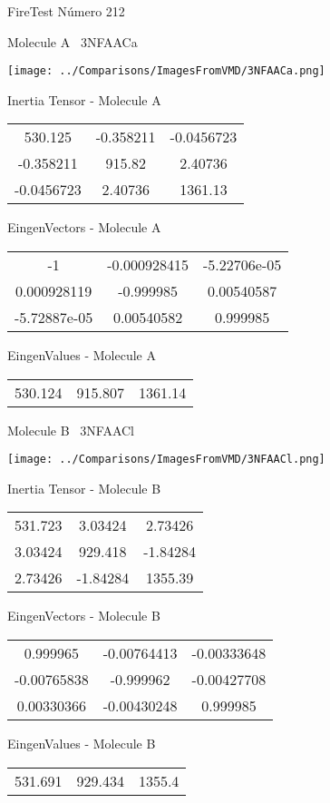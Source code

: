 \vtab[-3cm]
\begin{center}
{\large FireTest \tab Número 212}
\end{center}
\begin{multicols}{2}
\begin{center}

Molecule A \
3NFAACa

\texttt{[image: ../Comparisons/ImagesFromVMD/3NFAACa.png]}

Inertia Tensor - Molecule A \\
\begin{tabular}{|c c c|}
530.125	 & 	-0.358211	 & 	-0.0456723	 \\
-0.358211	 & 	915.82	 & 	2.40736	 \\
-0.0456723	 & 	2.40736	 & 	1361.13
\end{tabular}

\vtab
 EingenVectors - Molecule A     \\
\begin{tabular}{|c c c|}
-1	 & 	-0.000928415	 & 	-5.22706e-05	 \\
0.000928119	 & 	-0.999985	 & 	0.00540587	 \\
-5.72887e-05	 & 	0.00540582	 & 	0.999985
\end{tabular}

\vtab
 EingenValues - Molecule A     \\
\begin{tabular}{|c c c|}
530.124	 & 	915.807	 & 	1361.14	 \\
\end{tabular}
\columnbreak

Molecule B \
3NFAACl

\texttt{[image: ../Comparisons/ImagesFromVMD/3NFAACl.png]}

Inertia Tensor - Molecule B \\
\begin{tabular}{|c c c|}
531.723	 & 	3.03424	 & 	2.73426	 \\
3.03424	 & 	929.418	 & 	-1.84284	 \\
2.73426	 & 	-1.84284	 & 	1355.39
\end{tabular}

\vtab
 EingenVectors - Molecule B     \\
\begin{tabular}{|c c c|}
0.999965	 & 	-0.00764413	 & 	-0.00333648	 \\
-0.00765838	 & 	-0.999962	 & 	-0.00427708	 \\
0.00330366	 & 	-0.00430248	 & 	0.999985
\end{tabular}

\vtab
 EingenValues - Molecule B     \\
\begin{tabular}{|c c c|}
531.691	 & 	929.434	 & 	1355.4	 \\
\end{tabular}

\end{center}
\end{multicols}

